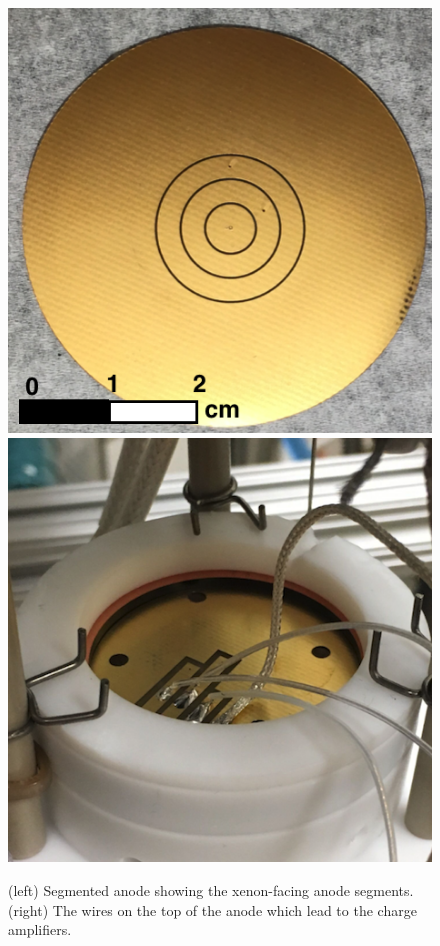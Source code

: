 \begin{figure}[htbp]
\begin{center}
\includegraphics[width=\halffig]{figures/testbed/anode.png}
\includegraphics[width=\halffig]{figures/testbed/anode2.png}
\caption{(left) Segmented anode showing the xenon-facing anode segments. (right) The wires on the top of the anode which lead to the charge amplifiers.}
\label{fig:anode}
\end{center}
\end{figure}


